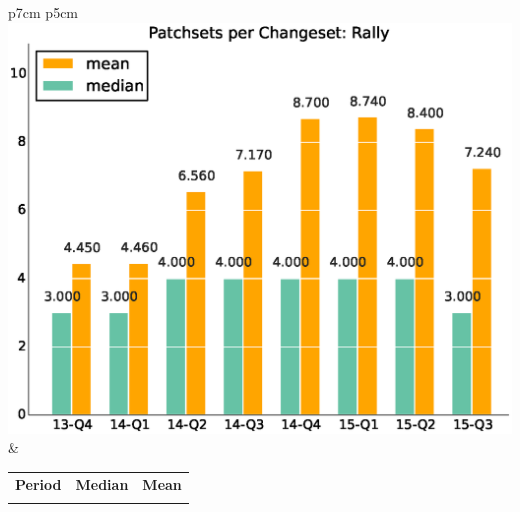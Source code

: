 \documentclass[a4wide,11pt]{article}
\begin{document}
\begin{tabular}{p{7cm} p{5cm}}
    \vspace{0pt} 
    \includegraphics[scale=.35]{figs/patchsets_avgRally.eps}
    & 
    \vspace{0pt}
    \begin{tabular}{l|r|r|}%
    \bfseries Period & \bfseries Median & \bfseries Mean %
    \csvreader[head to column names]{data/scr_patchsets_iterationsRally.csv}{}%
    {\\ & \medianpatchsets & \meanpatchsets}
    \end{tabular}
\end{tabular}
\end{document}

